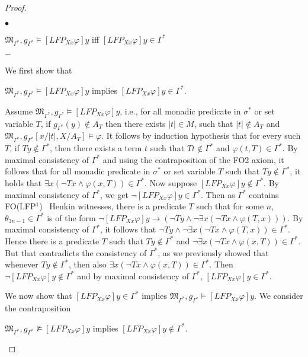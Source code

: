 \documentclass{LMCS}
\newcommand{\frM}{\mathfrak{M}}
\newcommand{\folfp}{\textsf{FO(LFP$^1$)}\xspace}
\begin{document}
\begin{proof}
\begin{iteMize}{$\bullet$}
\begin{center}
$\frM_{\Gamma^*}, g_{\Gamma^*} \models [LFP_{Xx}\varphi]y$ iff
$[LFP_{Xx}\varphi]y\in\Gamma^*$
\end{center}
\begin{iteMize}{$-$}
\item   We first show that
\begin{center}
$\frM_{\Gamma^*}, g_{\Gamma^*} \models
    [LFP_{Xx}\varphi]y$ implies
    $[LFP_{Xx}\varphi]y\in\Gamma^*$.
    \end{center}
    Assume $\frM_{\Gamma^*}, g_{\Gamma^*}
    \models [LFP_{Xx}\varphi]y$, i.e., for all monadic predicate in $\sigma^*$ or set variable $T$,
    if $g_{\Gamma^*}(y) \notin A_{T}$ then there exists $|t| \in M$, such that $|t| \notin A_{T}$ and
    $\frM_{\Gamma^*}, g_{\Gamma^*}[x/|t|,X/A_{T}] \models \varphi$. It follows by induction hypothesis that
    for every such $T$, if $Ty \not \in \Gamma^*$, then there exists a term $t$ such that $Tt \not \in \Gamma^*$ and
    $\varphi(t,T) \in \Gamma^*$. By maximal consistency of $\Gamma^*$ and using the contraposition of the FO2 axiom, it follows that  
    for all monadic predicate in $\sigma^*$ or set variable $T$ such that $Ty \not \in \Gamma^*$, it holds that
    $\exists x (\neg Tx \wedge \varphi(x,T)) \in \Gamma^*$.
    Now suppose $[LFP_{Xx}\varphi]y \notin \Gamma^*$. By maximal consistency of $\Gamma^*$, we get $\neg[LFP_{Xx}\varphi]y \in \Gamma^*$.
    Then as $\Gamma^*$ contains \folfp~ Henkin witnesses, there is a predicate $T$ such that for some $n$, $\theta_{3n-1} \in \Gamma^*$ is of the form $\neg[LFP_{Xx}\varphi]y \rightarrow (\neg Ty \wedge \neg \exists x(\neg Tx \wedge \varphi(T,x)))$. By maximal consistency of $\Gamma^*$, it follows that $\neg Ty \wedge \neg \exists x(\neg Tx \wedge \varphi(T,x)) \in \Gamma^*$. Hence there is a predicate $T$ such that $Ty \not\in \Gamma^*$ and $\neg \exists x (\neg Tx \wedge \varphi(x,T)) \in \Gamma^*$. But that contradicts the consistency of
    $\Gamma^*$, as we previously showed that whenever $Ty \not\in \Gamma^*$, then also  $\exists x (\neg Tx \wedge \varphi(x,T)) \in \Gamma^*$. Then $\neg[LFP_{Xx}\varphi]y \not\in \Gamma^*$ and by maximal consistency of $\Gamma^*$, $[LFP_{Xx}\varphi]y \in \Gamma^*$.
\item   We now show that $[LFP_{Xx}\varphi]y \in\Gamma^*$ implies
    $\frM_{\Gamma^*}, g_{\Gamma^*} \models
    [LFP_{Xx}\varphi]y$. We consider the contraposition
      \begin{center}
      $\frM_{\Gamma^*}, g_{\Gamma^*} \not\models [LFP_{Xx}\varphi]y$ implies
    $[LFP_{Xx}\varphi]y\not\in\Gamma^*$.

\end{center}
\end{iteMize}
\end{iteMize}
\end{proof}
\end{document}
